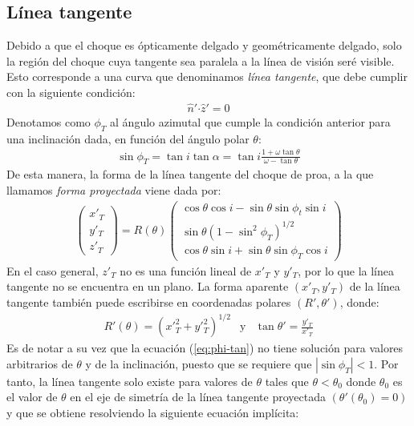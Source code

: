 \subsection{Línea tangente}
\label{sec:tangent-line}
Debido a que el choque es ópticamente delgado y geométricamente delgado, solo la región del choque cuya tangente sea paralela a la
línea de visión seré visible. Esto corresponde a una curva que denominamos \textit{línea tangente}, que debe cumplir con la siguiente
condición:
\begin{align}
  \hat{n}'\boldsymbol{\cdot} \hat{z}' = 0
\end{align}
Denotamos como $\phi_T$ al ángulo azimutal que cumple la condición anterior para una inclinación dada, en función del ángulo polar $\theta$:
\begin{align}
  \sin\phi_T = \tan i\tan\alpha = \tan i\frac{1+\omega\tan\theta}{\omega-\tan\theta}
  \label{eq:phi-tan}
\end{align}
De esta manera, la forma de la línea tangente del choque de proa, a la que llamamos \textit{forma proyectada} viene dada por:
\begin{align}
  \left(
  \begin{array}{c}
    x'_T \\
    y'_T \\
    z'_T
  \end{array}
  \right) =
  R(\theta)\left(
  \begin{array}{c}
    \cos\theta\cos i - \sin\theta\sin\phi_t\sin i \\
    \sin\theta\left(1-\sin^2\phi_T\right)^{1/2} \\
    \cos\theta\sin i + \sin\theta\sin\phi_T\cos i
  \end{array}
  \right) \label{eq:proj-shape}
\end{align}
En el caso general, $z'_T$ no es una función lineal de $x'_T$ y $y'_T$, por lo que la línea tangente no se encuentra en un plano. La forma aparente $(x'_T, y'_T)$  de la línea tangente también puede escribirse en coordenadas polares $(R', \theta')$, donde:
\begin{align}
  R'(\theta) = \left(x'^2_T + y'^2_T\right)^{1/2} & \mathrm{y} & \tan\theta' = \frac{y'_T}{x'_T}
  \label{eq:polar}
\end{align}
Es de notar a su vez que la ecuación (\ref{eq:phi-tan}) no tiene solución para valores arbitrarios de $\theta$ y de la inclinación, puesto que se requiere que $\left|\sin\phi_T\right| < 1$. Por tanto, la línea tangente solo existe para valores de $\theta$ tales que $\theta < \theta_0$ donde $\theta_0$ es el valor de $\theta$ en el eje de simetría de la línea tangente proyectada $(\theta'(\theta_0) = 0)$ y que se obtiene resolviendo la siguiente ecuación implícita:
